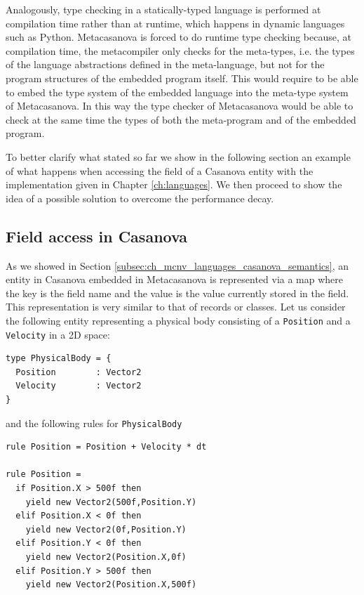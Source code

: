\noindent
Analogously, type checking in a statically-typed language is performed at compilation time rather than at runtime, which happens in dynamic languages such as Python. Metacasanova is forced to do runtime type checking because, at compilation time, the metacompiler only checks for the meta-types, i.e. the types of the language abstractions defined in the meta-language, but not for the program structures of the embedded program itself. This would require to be able to embed the type system of the embedded language into the meta-type system of Metacasanova. In this way the type checker of Metacasanova would be able to check at the same time the types of both the meta-program and of the embedded program. 

To better clarify what stated so far we show in the following section an example of what happens when accessing the field of a Casanova entity with the implementation given in Chapter \ref{ch:languages}. We then proceed to show the idea of a possible solution to overcome the performance decay.

\subsection{Field access in Casanova}
\label{subsec:ch_functors_casanova_example}
As we showed in Section \ref{subsec:ch_mcnv_languages_casanova_semantics}, an entity in Casanova embedded in Metacasanova is represented via a map where the key is the field name and the value is the value currently stored in the field. This representation is very similar to that of records or classes. Let us consider the following entity representing a physical body consisting of a \texttt{Position} and a \texttt{Velocity} in a 2D space:

\begin{lstlisting}
type PhysicalBody = {
  Position        : Vector2
  Velocity        : Vector2
}
\end{lstlisting}

\noindent
and the following rules for \texttt{PhysicalBody}

\begin{lstlisting}
rule Position = Position + Velocity * dt

rule Position =
  if Position.X > 500f then
    yield new Vector2(500f,Position.Y)
  elif Position.X < 0f then
    yield new Vector2(0f,Position.Y)
  elif Position.Y < 0f then
    yield new Vector2(Position.X,0f)
  elif Position.Y > 500f then
    yield new Vector2(Position.X,500f)
\end{lstlisting}

